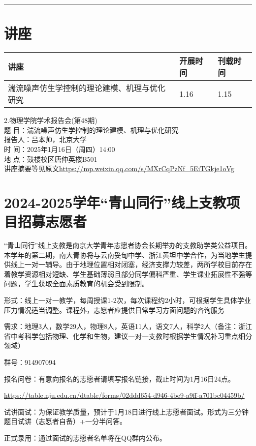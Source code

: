 \documentclass[letterpaper, 12pt]{article}
\begin{document}
\hrule
\pagebreak
\begin{multicols}{2}

\section{讲座}
\begin{tabularx}{0.5\textwidth}{|X|X|X|}
    \hline
    讲座 & 开展时间 & 刊载时间\\
    \hline\hline
湍流噪声仿生学控制的理论建模、机理与优化研究 & 1.16 & 1.15\\\hline
\end{tabularx}
2.物理学院学术报告会(第48期)\\
题   目：湍流噪声仿生学控制的理论建模、机理与优化研究\\
报告人：吕本帅，北京大学\\
时   间：2025年1月16日（周四）14:00\\
地   点：鼓楼校区唐仲英楼B501\\
讲座摘要等见原文\url{https://mp.weixin.qq.com/s/MXrCqPzNf_5EiTGkje1oVg}\\

\section{2024-2025学年“青山同行”线上支教项目招募志愿者}
“青山同行”线上支教是南京大学青年志愿者协会长期举办的支教助学类公益项目。本学年的第二期，南大青协将与云南妥甸中学、浙江黄坦中学合作，为当地学生提供线上一对一辅导。由于地理位置相对闭塞，经济支撑力较差，两所学校目前存在着教学资源相对短缺、学生基础薄弱且部分同学偏科严重、学生课业拓展性不强等问题，学生获取全面素质教育的机会受到限制。

形式：线上一对一教学，每周授课1-2次，每次课程约2小时，可根据学生具体学业压力情况适当调整。课程外，志愿者应提供日常学习方面问题的咨询服务

需求：地理3人，数学29人，物理8人，英语11人，语文7人，科学2人（备注：浙江省中考科学包括物理、化学和生物，建议一对一支教时根据学生情况补习重点细分领域）

群号：914907094

报名问卷：有意向报名的志愿者请填写报名链接，截止时间为1月16日24点。

\url{https://table.nju.edu.cn/dtable/forms/02ddd654-d946-4be9-a9ff-a701bc04459b/}

试讲面试：为保证教学质量，预计于1月18日进行线上志愿者面试。形式为三分钟题目试讲（志愿者自备）+一分半问答。

正式录用：通过面试的志愿者名单将在QQ群内公布。

\end{multicols}
\end{document}
